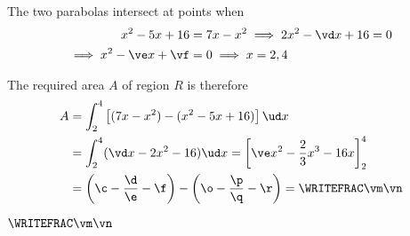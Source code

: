 \begin{solution}[\fullpage]
	The two parabolas intersect at points when 
  \begin{align}
    x^2-\va x + \vb &= \vc x - x^2 \implies 2x^2 - \vd x + \vb = 0 \\ 
    \implies x^2-\ve x + \vf &= 0 \implies x=\vx,\vy 
  \end{align}
	
	The required area $A$ of region $R$ is therefore
	\begin{align}
	  A &= \int_\vx^\vy\left[ (\vc x-x^2) - (x^2-\va x + \vb)\right]\ud x \\
	    &= \int_\vx^\vy (\vd x - 2x^2 - \vb) \ud x = \left[ \ve x^2 -\dfrac{2}{3}x^3 - \vb x\right]_\vx^\vy \\
      &= \left(\c - \dfrac\d\e - \f\right) - \left( \o-\dfrac\p\q - \r\right) = \WRITEFRAC\vm\vn
	\end{align}
\end{solution}

\ifprintanswers\begin{codex}$\WRITEFRAC\vm\vn$\end{codex}\fi
